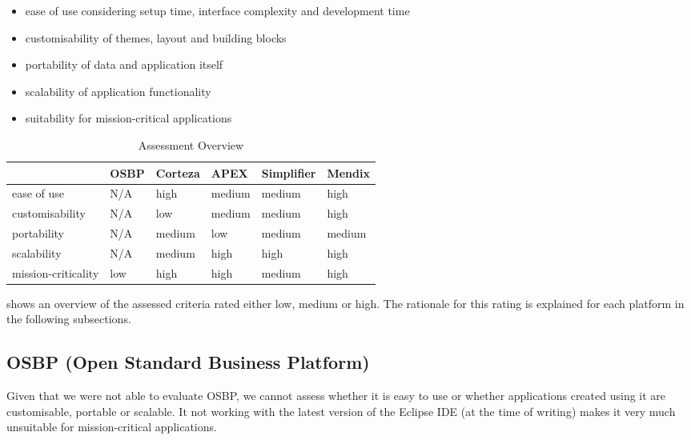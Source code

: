 \documentclass[runningheads]{llncs}
\begin{document}
\begin{itemize}
  \item ease of use considering setup time, interface complexity and development time
  \item customisability of themes, layout and building blocks
  \item portability of data and application itself
  \item scalability of application functionality
  \item suitability for mission-critical applications
\end{itemize}

\begin{table}[]
  \centering
  \begin{tabular}{l|l|l|l|l|l|}
    \cline{2-6}                               & \textbf{OSBP} & \textbf{Corteza} & \textbf{APEX}   & \textbf{Simplifier} & \textbf{Mendix} \\ \hline
    \multicolumn{1}{|l|}{ease of use}         & N/A  & high    & medium & medium     & high   \\ \hline
    \multicolumn{1}{|l|}{customisability}     & N/A  & low     & medium & medium     & high   \\ \hline
    \multicolumn{1}{|l|}{portability}         & N/A  & medium  & low    & medium     & medium \\ \hline
    \multicolumn{1}{|l|}{scalability}         & N/A  & medium  & high   & high       & high   \\ \hline
    \multicolumn{1}{|l|}{mission-criticality} & low  & high    & high   & medium     & high   \\ \hline
  \end{tabular}
  \caption{Assessment Overview}
  \label{tab::assessment}
\end{table}

 shows an overview of the assessed criteria rated either low, medium or high. The rationale for this rating is explained for each platform in the following subsections.

\subsection{OSBP (Open Standard Business Platform)}

Given that we were not able to evaluate OSBP, we cannot assess whether it is easy to use or whether applications created using it are customisable, portable or scalable. It not working with the latest version of the Eclipse IDE (at the time of writing) makes it very much unsuitable for mission-critical applications.
\end{document}

